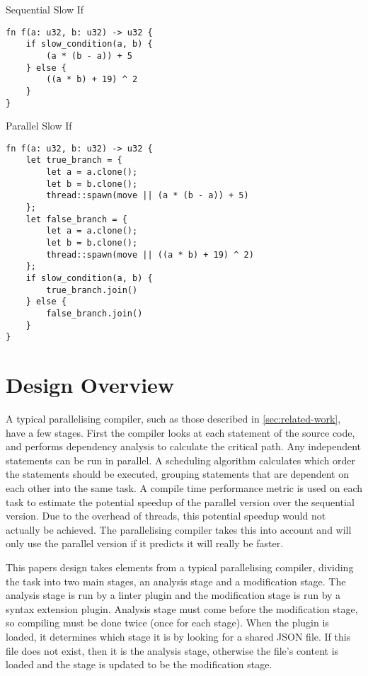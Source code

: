 \documentclass[conference]{IEEEtran}
\begin{document}
\begin{algorithm}
\caption{Sequential Slow If}
\label{code:seq-slowif}
\begin{verbatim}
fn f(a: u32, b: u32) -> u32 {
    if slow_condition(a, b) {
        (a * (b - a)) + 5
    } else {
        ((a * b) + 19) ^ 2
    }
}
\end{verbatim}
\end{algorithm}

\begin{algorithm}
\caption{Parallel Slow If}
\label{code:par-slowif}
\begin{verbatim}
fn f(a: u32, b: u32) -> u32 {
    let true_branch = {
        let a = a.clone();
        let b = b.clone();
        thread::spawn(move || (a * (b - a)) + 5)
    };
    let false_branch = {
        let a = a.clone();
        let b = b.clone();
        thread::spawn(move || ((a * b) + 19) ^ 2)
    };
    if slow_condition(a, b) {
        true_branch.join()
    } else {
        false_branch.join()
    }
}

\end{verbatim}
\end{algorithm}



\section{Design Overview}
\label{sec:design}
A typical parallelising compiler, such as those described in \autoref{sec:related-work}, have a few stages. First the compiler looks at each statement of the source code, and performs dependency analysis to calculate the critical path. Any independent statements can be run in parallel. A scheduling algorithm calculates which order the statements should be executed, grouping statements that are dependent on each other into the same task. A compile time performance metric is used on each task to estimate the potential speedup of the parallel version over the sequential version. Due to the overhead of threads, this potential speedup would not actually be achieved. The parallelising compiler takes this into account and will only use the parallel version if it predicts it will really be faster.

This papers design takes elements from a typical parallelising compiler, dividing the task into two main stages, an analysis stage and a modification stage. The analysis stage is run by a linter plugin and the modification stage is run by a syntax extension plugin. Analysis stage must come before the modification stage, so compiling must be done twice (once for each stage).
When the plugin is loaded, it determines which stage it is by looking for a shared JSON file. If this file does not exist, then it is the analysis stage, otherwise the file's content is loaded and the stage is updated to be the modification stage.
\end{document}

